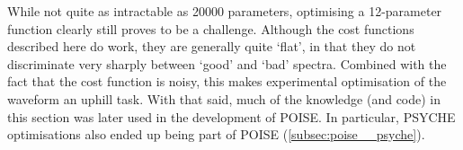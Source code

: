 

While not quite as intractable as 20000 parameters, optimising a 12-parameter function clearly still proves to be a challenge.
Although the cost functions described here do work, they are generally quite `flat', in that they do not discriminate very sharply between `good' and `bad' spectra.
Combined with the fact that the cost function is noisy, this makes experimental optimisation of the waveform an uphill task.
With that said, much of the knowledge (and code) in this section was later used in the development of POISE.
In particular, PSYCHE optimisations also ended up being part of POISE (\cref{subsec:poise__psyche}).
